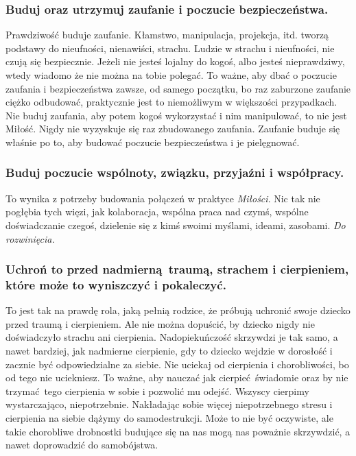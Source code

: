 \documentclass[../dotknieci-miloscia.tex]{subfiles}
\begin{document}
\subsubsection{Buduj oraz utrzymuj zaufanie i poczucie bezpieczeństwa.}
Prawdziwość buduje zaufanie. 
Kłamstwo, manipulacja, projekcja, itd. 
tworzą podstawy do nieufności, nienawiści, strachu.
Ludzie w strachu i nieufności, nie czują się bezpiecznie. 
Jeżeli nie jesteś lojalny do kogoś, albo jesteś nieprawdziwy, 
wtedy wiadomo że nie można na tobie polegać. 
To ważne, aby dbać o poczucie zaufania i bezpieczeństwa zawsze, 
od samego początku, bo raz zaburzone zaufanie ciężko odbudować, 
praktycznie jest to niemożliwym w większości przypadkach. 
Nie buduj zaufania, aby potem kogoś wykorzystać i nim manipulować, to nie jest Miłość. 
Nigdy nie wyzyskuje się raz zbudowanego zaufania. 
Zaufanie buduje się właśnie po to, 
aby budować poczucie bezpieczeństwa i je pielęgnować. 
 
\subsubsection{Buduj poczucie wspólnoty, związku, przyjaźni i współpracy.}
To wynika z potrzeby budowania połączeń w praktyce \emph{Miłości}. 
Nic tak nie pogłębia tych więzi, jak kolaboracja, 
wspólna praca nad czymś, wspólne doświadczanie czegoś, 
dzielenie się z kimś swoimi myślami, ideami, zasobami.
\emph{Do rozwinięcia.}

\subsubsection{Uchroń to przed nadmierną traumą, strachem i cierpieniem, które może to wyniszczyć i pokaleczyć.}
To jest tak na prawdę rola, jaką pełnią rodzice, 
że próbują uchronić swoje dziecko przed traumą i cierpieniem.
Ale nie można dopuścić, by dziecko nigdy nie doświadczyło strachu ani cierpienia.
Nadopiekuńczość skrzywdzi je tak samo, a nawet bardziej, jak nadmierne cierpienie, 
gdy to dziecko wejdzie w dorosłość i zacznie być odpowiedzialne za siebie.
Nie uciekaj od cierpienia i chorobliwości, bo od tego nie uciekniesz.
To ważne, aby nauczać jak cierpieć świadomie 
oraz by nie trzymać tego cierpienia w sobie i pozwolić mu odejść.
Wszyscy cierpimy wystarczająco, niepotrzebnie.
Nakładając sobie więcej niepotrzebnego stresu i cierpienia na siebie dążymy do samodestrukcji.
Może to nie być oczywiste, ale takie chorobliwe drobnostki 
budujące się na nas mogą nas poważnie skrzywdzić, a nawet doprowadzić do samobójstwa.
\end{document}
